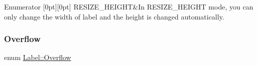 \begin{DoxyEnumFields}{Enumerator}
[0pt][0pt]{}\mbox{\label{classLabel_af7d31998ea743e8ca64eb1a983fa6a4ca25ddd126af75d0a6b8e195603cad17eb}} 
R\+E\+S\+I\+Z\+E\+\_\+\+H\+E\+I\+G\+HT&In R\+E\+S\+I\+Z\+E\+\_\+\+H\+E\+I\+G\+HT mode, you can only change the width of label and the height is changed automatically. \\
\hline

\end{DoxyEnumFields}
\mbox{\label{classLabel_af7d31998ea743e8ca64eb1a983fa6a4c}} 
\subsubsection{\texorpdfstring{Overflow}{Overflow}\hspace{0.1cm}{\footnotesize\ttfamily [2/2]}}
{\footnotesize\ttfamily enum \hyperlink{classLabel_af7d31998ea743e8ca64eb1a983fa6a4c}{Label\+::\+Overflow}\hspace{0.3cm}{\ttfamily [strong]}}

